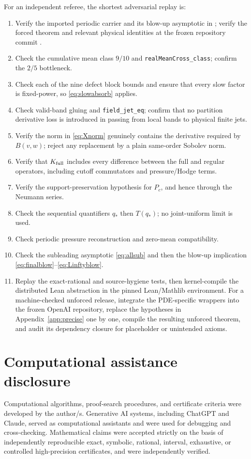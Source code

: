 \documentclass[11pt]{article}
\numberwithin{equation}{section}
\begin{document}
For an independent referee, the shortest adversarial replay is:
\begin{enumerate}[label=\textbf{R\arabic*.}]
\item Verify the imported periodic carrier and its blow-up asymptotic in \cite{OpenAI2026NS}; verify the forced theorem and relevant physical identities at the frozen repository commit \cite{OpenAIRepo2026}.
\item Check the cumulative mean class \(9/10\) and \texttt{realMeanCross\_class}; confirm the \(2/5\) bottleneck.
\item Check each of the nine defect block bounds and ensure that every slow factor is fixed-power, so \eqref{eq:slowabsorb} applies.
\item Check valid-band gluing and \texttt{field\_jet\_eq}; confirm that no partition derivative loss is introduced in passing from local bands to physical finite jets.
\item Verify the norm in \eqref{eq:Xnorm} genuinely contains the derivative required by \(B(v,w)\); reject any replacement by a plain same-order Sobolev norm.
\item Verify that \(K_{\rm full}\) includes every difference between the full and regular operators, including cutoff commutators and pressure/Hodge terms.
\item Verify the support-preservation hypothesis for \(P_c\), and hence through the Neumann series.
\item Check the sequential quantifiers \(q_*\) then \(T(q_*)\); no joint-uniform limit is used.
\item Check periodic pressure reconstruction and zero-mean compatibility.
\item Check the subleading asymptotic \eqref{eq:allsub} and then the blow-up implication \eqref{eq:finalblow}--\eqref{eq:Linftyblow}.
\item Replay the exact-rational and source-hygiene tests, then kernel-compile the distributed Lean abstraction in the pinned Lean/Mathlib environment.  For a machine-checked unforced release, integrate the PDE-specific wrappers into the frozen OpenAI repository, replace the hypotheses in Appendix~\ref{app:precise} one by one, compile the resulting unforced theorem, and audit its dependency closure for placeholder or unintended axioms.
\end{enumerate}

\section*{Computational assistance disclosure}
Computational algorithms, proof-search procedures, and certificate criteria were developed by the author/s. Generative AI systems, including ChatGPT and Claude, served as computational assistants and were used for debugging and cross-checking. Mathematical claims were accepted strictly on the basis of independently reproducible exact, symbolic, rational, interval, exhaustive, or controlled high-precision certificates, and were independently verified.

\printbibliography[title={References}]
\end{document}
